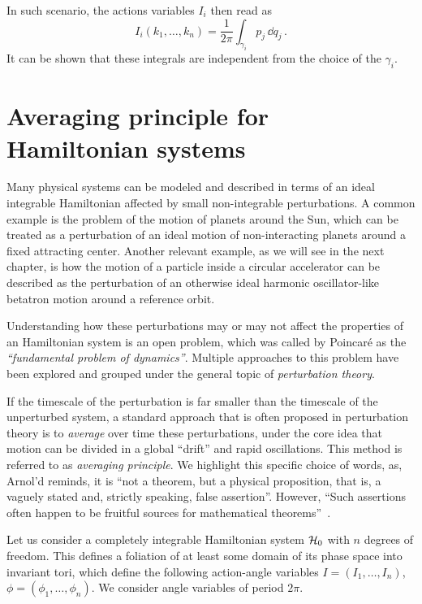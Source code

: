In such scenario, the actions variables $I_i$ then read as
%
\begin{equation}
    I_i(k_1,\dots,k_n) = \frac{1}{2\pi}\int_{\gamma_i} p_j\, \dd q_j\, .  
\end{equation} 
%
It can be shown that these integrals are independent from the choice of the $\gamma_i$.~\cite{Arnold:937549}

\section{Averaging principle for Hamiltonian systems}\label{sec:1:averaging}

Many physical systems can be modeled and described in terms of an ideal integrable Hamiltonian affected by small non-integrable perturbations. A common example is the problem of the motion of planets around the Sun, which can be treated as a perturbation of an ideal motion of non-interacting planets around a fixed attracting center. Another relevant example, as we will see in the next chapter, is how the motion of a particle inside a circular accelerator can be described as the perturbation of an otherwise ideal harmonic oscillator-like betatron motion around a reference orbit.

Understanding how these perturbations may or may not affect the properties of an Hamiltonian system is an open problem, which was called by Poincaré as the \textit{``fundamental problem of dynamics''}. Multiple approaches to this problem have been explored and grouped under the general topic of \textit{perturbation theory}.

If the timescale of the perturbation is far smaller than the timescale of the unperturbed system, a standard approach that is often proposed in perturbation theory is to \textit{average} over time these perturbations, under the core idea that motion can be divided in a global ``drift'' and rapid oscillations. This method is referred to as \textit{averaging principle}. We highlight this specific choice of words, as, Arnol'd reminds, it is ``not a theorem, but a physical proposition, that is, a vaguely stated and, strictly speaking, false assertion''. However, ``Such assertions often happen to be fruitful sources for mathematical theorems''~\cite{Arnold:937549}.

Let us consider a completely integrable Hamiltonian system $\mathcal{H}_0$ with $n$ degrees of freedom. This defines a foliation of at least some domain of its phase space into invariant tori, which define the following action-angle variables $I=(I_1, \ldots, I_n)$, $\phi=(\phi_1, \ldots, \phi_n)$. We consider angle variables of period $2\pi$.

